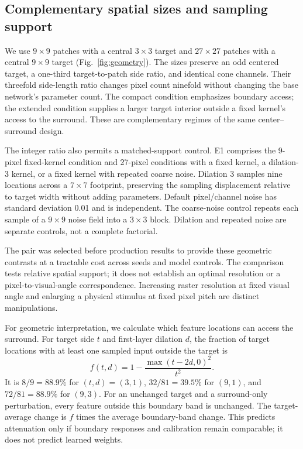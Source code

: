 \documentclass[authoryear,preprint,review,12pt]{elsarticle}
\begin{document}
\subsection{Complementary spatial sizes and sampling support}\label{sec:geometry}
We use $9\times9$ patches with a central $3\times3$ target and $27\times27$ patches with a central $9\times9$ target (Fig.~\ref{fig:geometry}). The sizes preserve an odd centered target, a one-third target-to-patch side ratio, and identical cone channels. Their threefold side-length ratio changes pixel count ninefold without changing the base network's parameter count. The compact condition emphasizes boundary access; the extended condition supplies a larger target interior outside a fixed kernel's access to the surround. These are complementary regimes of the same center--surround design.

The integer ratio also permits a matched-support control. E1 comprises the 9-pixel fixed-kernel condition and 27-pixel conditions with a fixed kernel, a dilation-3 kernel, or a fixed kernel with repeated coarse noise. Dilation 3 samples nine locations across a $7\times7$ footprint, preserving the sampling displacement relative to target width without adding parameters. Default pixel/channel noise has standard deviation 0.01 and is independent. The coarse-noise control repeats each sample of a $9\times9$ noise field into a $3\times3$ block. Dilation and repeated noise are separate controls, not a complete factorial.

The pair was selected before production results to provide these geometric contrasts at a tractable cost across seeds and model controls. The comparison tests relative spatial support; it does not establish an optimal resolution or a pixel-to-visual-angle correspondence. Increasing raster resolution at fixed visual angle and enlarging a physical stimulus at fixed pixel pitch are distinct manipulations.

For geometric interpretation, we calculate which feature locations can access the surround. For target side $t$ and first-layer dilation $d$, the fraction of target locations with at least one sampled input outside the target is
\begin{equation}\label{eq:boundary}
f(t,d)=1-\frac{\max(t-2d,0)^2}{t^2}.
\end{equation}
It is $8/9=88.9\%$ for $(t,d)=(3,1)$, $32/81=39.5\%$ for $(9,1)$, and $72/81=88.9\%$ for $(9,3)$. For an unchanged target and a surround-only perturbation, every feature outside this boundary band is unchanged. The target-average change is $f$ times the average boundary-band change. This predicts attenuation only if boundary responses and calibration remain comparable; it does not predict learned weights.
\end{document}
